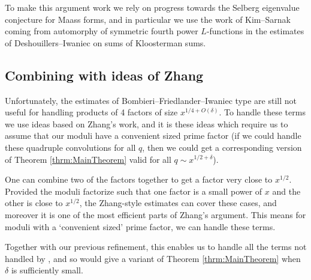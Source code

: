 \documentclass[10pt]{amsart}
\theoremstyle{plain}
\numberwithin{equation}{section}
\begin{document}
To make this argument work we rely on progress towards the Selberg eigenvalue conjecture for Maass forms, and in particular we use the work of Kim--Sarnak \cite{KimSarnak} coming from automorphy of symmetric fourth power $L$-functions in the estimates of Deshouillers--Iwaniec \cite{DeshouillersIwaniec} on sums of Kloosterman sums.
%
%
%
%
\subsection{Combining with ideas of Zhang}
%
%
%
%
Unfortunately, the estimates of Bombieri--Friedlander--Iwaniec type are still not useful for handling products of 4 factors of size $x^{1/4+O(\delta)}$. To handle these terms we use ideas based on Zhang's work, and it is these ideas which require us to assume that our moduli have a convenient sized prime factor (if we could handle these quadruple convolutions for all $q$, then we could get a corresponding version of Theorem \ref{thrm:MainTheorem} valid for all $q\sim x^{1/2+\delta}$). 

One can combine two of the factors together to get a factor very close to $x^{1/2}$. Provided the moduli factorize such that one factor is a small power of $x$ and the other is close to $x^{1/2}$, the Zhang-style estimates can cover these cases, and moreover it is one of the most efficient parts of Zhang's argument. This means for moduli with a `convenient sized' prime factor, we can handle these terms.

Together with our previous refinement, this enables us to handle all the terms not handled by \cite{BFI3}, and so would give a variant of Theorem \ref{thrm:MainTheorem} when $\delta$ is sufficiently small.
%
%
%
%
\end{document}
